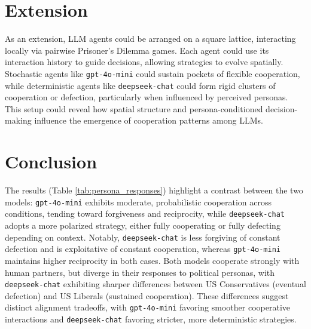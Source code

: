 \documentclass[%
 reprint,
 amsmath,amssymb,
 aps,
]{revtex4-2}
\begin{document}
\section{Extension}

As an extension, LLM agents could be arranged on a square lattice, interacting locally via pairwise Prisoner’s Dilemma games. Each agent could use its interaction history to guide decisions, allowing strategies to evolve spatially. Stochastic agents like \texttt{gpt-4o-mini} could sustain pockets of flexible cooperation, while deterministic agents like \texttt{deepseek-chat} could form rigid clusters of cooperation or defection, particularly when influenced by perceived personas. This setup could reveal how spatial structure and persona-conditioned decision-making influence the emergence of cooperation patterns among LLMs.



\section{Conclusion}
 The results (Table \ref{tab:persona_responses}) highlight a contrast between the two models: \texttt{gpt-4o-mini} exhibits moderate, probabilistic cooperation across conditions, tending toward forgiveness and reciprocity, while \texttt{deepseek-chat} adopts a more polarized strategy, either fully cooperating or fully defecting depending on context. Notably, \texttt{deepseek-chat} is less forgiving of constant defection and is exploitative of constant cooperation, whereas \texttt{gpt-4o-mini} maintains higher reciprocity in both cases. Both models cooperate strongly with human partners, but diverge in their responses to political personas, with \texttt{deepseek-chat} exhibiting sharper differences between US Conservatives (eventual defection) and US Liberals (sustained cooperation). These differences suggest distinct alignment tradeoffs, with \texttt{gpt-4o-mini} favoring smoother cooperative interactions and \texttt{deepseek-chat} favoring stricter, more deterministic strategies.


\end{document}

